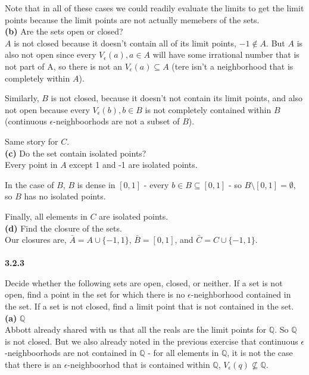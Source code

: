Note that in all of these cases we could readily evaluate the limits to get the limit points because the limit points
are not actually memebers of the sets.
\\


\textbf{(b)} Are the sets open or closed?
\\

$A$ is not closed because it doesn't contain all of its limit points, $-1 \notin A$.
But $A$ is also not open since every $V_\epsilon (a), a\in A$ will have some irrational number that is not part of A,
so there is not an $V_{\epsilon} (a) \subseteq A$ (tere isn't a neighborhood that is completely within $A$).

Similarly, $B$ is not closed, because it doesn't not contain its limit points, and also not open
because every $V_\epsilon (b), b\in B$ is not completely contained within $B$
(continuous $\epsilon$-neighboorhods are not a subset of $B$).

Same story for $C$.
\\


\textbf{(c)} Do the set contain isolated points?
\\


Every point in $A$ except 1 and -1 are isolated points.

In the case of $B$, $B$ is dense in $[0,1]$ - every $b\in B \subseteq [0,1]$ - so $B \setminus [0,1] = \emptyset$, so
$B$ has no isolated points.

Finally, all elements in $C$ are isolated points.
\\

\textbf{(d)} Find the closure of the sets.
\\

Our closures are, $\bar{A} = A \cup \{-1, 1\}$, $\bar{B} = [0,1]$, and $\bar{C} = C \cup \{-1, 1\}$.
\\~\\



\textbf{3.2.3}

Decide whether the following sets are open, closed, or neither.
If a set is not open, find a point in the set for which there is no $\epsilon$-neighborhood contained in the set.
If a set is not closed, find a limit point that is not contained in the set. 
\\

\textbf{(a)} $\mathbb{Q}$
\\

Abbott already shared with us that all the reals are the limit points for $\mathbb{Q}$.
So $\mathbb{Q}$ is not closed.
But we also already noted in the previous exercise that continuous $\epsilon$-neighboorhods are not contained in
$\mathbb{Q}$ - for all elements in $\mathbb{Q}$, it is not the case that there is an $\epsilon$-neighboorhod
that is contained within $\mathbb{Q}$, $V_\epsilon (q) \not\subseteq \mathbb{Q}$.

